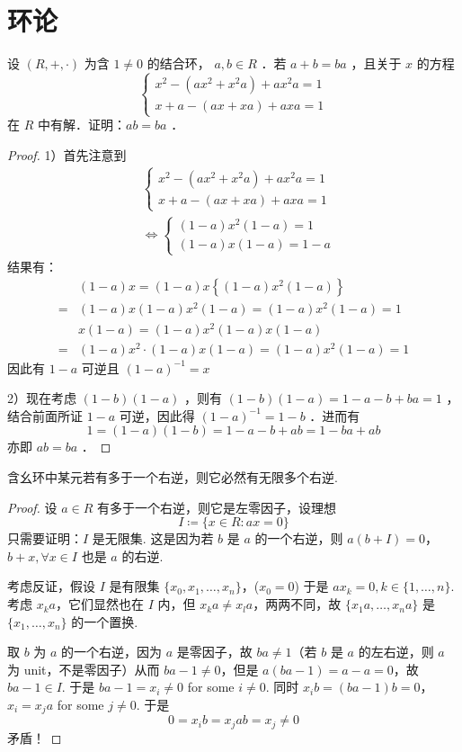 \section{环论}

\begin{theorem}
设 $(R,+, \cdot)$ 为含 $1 \neq 0$ 的结合环， $a, b \in R$ ．若 $a+b=b a$ ，且关于 $x$ 的方程
\[
\left\{\begin{array}{l}
x^2-\left(a x^2+x^2 a\right)+a x^2 a=1 \\
x+a-(a x+x a)+a x a=1
\end{array}\right.
\]在 $R$ 中有解．证明：$a b=b a$ ．
\end{theorem}
\begin{proof}
1）首先注意到
\[
\begin{aligned}
& \left\{\begin{array}{l}
x^2-\left(a x^2+x^2 a\right)+a x^2 a=1 \\
x+a-(a x+x a)+a x a=1
\end{array}\right. \\
& \Leftrightarrow\left\{\begin{array}{c}
(1-a) x^2(1-a)=1 \\
(1-a) x(1-a)=1-a
\end{array}\right.
\end{aligned}
\]
结果有：
\[
\begin{aligned}
& (1-a) x=(1-a) x\left\{(1-a) x^2(1-a)\right\} \\
= & (1-a) x(1-a) x^2(1-a)=(1-a) x^2(1-a)=1 \\
& x(1-a)=(1-a) x^2(1-a) x(1-a) \\
= & (1-a) x^2 \cdot(1-a) x(1-a)=(1-a) x^2(1-a)=1
\end{aligned}
\]
因此有 $1-a$ 可逆且 $(1-a)^{-1}=x$

2）现在考虑 $(1-b)(1-a)$ ，则有 $(1-b)(1-a)=1-a-b+b a=1$ ，结合前面所证 $1-a$ 可逆，因此得 $(1-a)^{-1}=1-b$ ．进而有
\[
1=(1-a)(1-b)=1-a-b+a b=1-b a+a b
\]
亦即 $a b=b a$ ．

\end{proof}

\begin{exercise}[Kaplansky]
含幺环中某元若有多于一个右逆，则它必然有无限多个右逆.
\end{exercise}
\begin{proof}
设 $a\in R$ 有多于一个右逆，则它是左零因子，设理想
\[
I\coloneqq \{ x\in R:ax=0 \}
\]
只需要证明：$I$ 是无限集. 这是因为若 $b$ 是 $a$ 的一个右逆，则 $a(b+I)=0$，$b+x, \forall x\in I$ 也是 $a$ 的右逆.

考虑反证，假设 $I$ 是有限集 $\{x_0, x_1,\dots,x_n \}$，($x_0=0$) 于是 $ax_k=0, k\in \{ 1,\dots,n \}$. 考虑 $x_ka$，它们显然也在 $I$ 内，但 $x_ka\neq x_{l}a$，两两不同，故 $\{ x_1a,\dots,x_na \}$ 是 $\{ x_1,\dots,x_n \}$ 的一个置换.

取 $b$ 为 $a$ 的一个右逆，因为 $a$ 是零因子，故 $ba\neq1$（若 $b$ 是 $a$ 的左右逆，则 $a$ 为 unit，不是零因子）从而 $ba-1\neq0$，但是 $a(ba-1)=a-a=0$，故 $ba-1\in I$. 于是 $ba-1=x_i\neq0$ for some $i\neq0$. 同时 $x_ib=(ba-1)b=0$，$x_i=x_ja$ for some $j\neq0$. 于是
\[
0=x_ib=x_jab=x_j\neq 0
\]
矛盾！

\end{proof}

